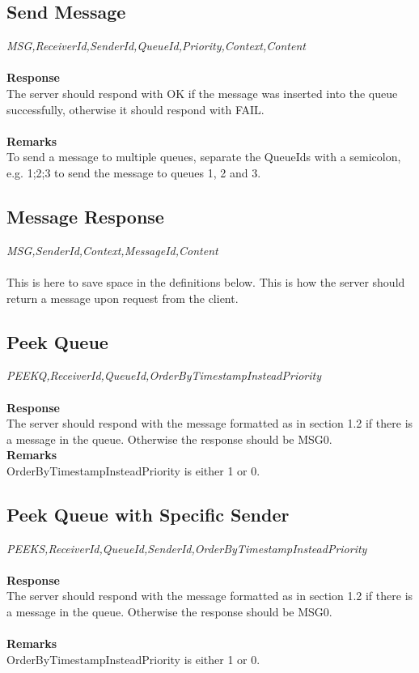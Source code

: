 \documentclass{article}
\begin{document}
            \subsection{Send Message}
                \indent\indent\textit{MSG,ReceiverId,SenderId,QueueId,Priority,Context,Content}\\
                \\
                \textbf{Response}\\
                The server should respond with OK if the message was inserted into the queue successfully, otherwise it should respond with FAIL.\\
                \\
                \textbf{Remarks}\\
                To send a message to multiple queues, separate the QueueIds with a semicolon, e.g. 1;2;3 to send the message to queues 1, 2 and 3.

            \subsection{Message Response}
                \indent\indent\textit{MSG,SenderId,Context,MessageId,Content}\\
                \\
                This is here to save space in the definitions below. This is how the server should return a message upon request from the client.

            \subsection{Peek Queue}
                \indent\indent \textit{PEEKQ,ReceiverId,QueueId,OrderByTimestampInsteadPriority}\\
                \\
                \textbf{Response}\\
                The server should respond with the message formatted as in section 1.2 if there is a message in the queue. Otherwise the response should be MSG0.\\
                \textbf{Remarks}\\
                OrderByTimestampInsteadPriority is either 1 or 0.

            \subsection{Peek Queue with Specific Sender}
                \indent\indent\textit{PEEKS,ReceiverId,QueueId,SenderId,OrderByTimestampInsteadPriority}\\
            \\
            \textbf{Response}\\
            The server should respond with the message formatted as in section 1.2 if there is a message in the queue. Otherwise the response should be MSG0.\\
            \\
            \textbf{Remarks}\\
            OrderByTimestampInsteadPriority is either 1 or 0.
\end{document}
